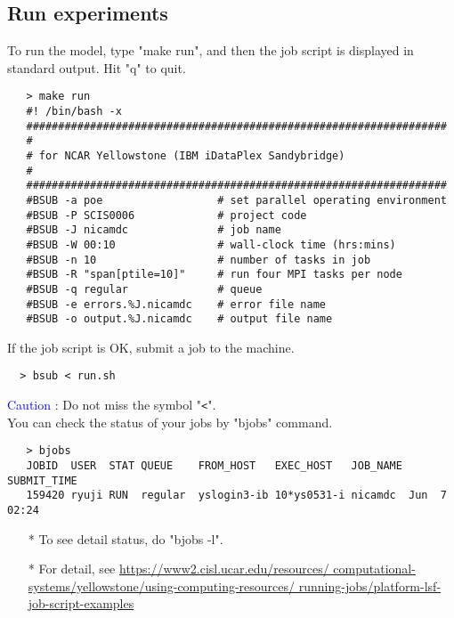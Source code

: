 \documentclass[a4paper]{article}
\begin{document}
\subsection{Run experiments}
   To run the model, type "make run", and then the job script is
   displayed in standard output. Hit "q" to quit.
 \begin{verbatim}
   > make run
   #! /bin/bash -x
   ##################################################################
   #
   # for NCAR Yellowstone (IBM iDataPlex Sandybridge)
   #
   ##################################################################
   #BSUB -a poe                  # set parallel operating environment
   #BSUB -P SCIS0006             # project code
   #BSUB -J nicamdc              # job name
   #BSUB -W 00:10                # wall-clock time (hrs:mins)
   #BSUB -n 10                   # number of tasks in job
   #BSUB -R "span[ptile=10]"     # run four MPI tasks per node
   #BSUB -q regular              # queue
   #BSUB -e errors.%J.nicamdc    # error file name
   #BSUB -o output.%J.nicamdc    # output file name
 \end{verbatim}

 \noindent If the job script is OK, submit a job to the machine.
 \begin{verbatim}
  > bsub < run.sh
 \end{verbatim}
 \noindent \textcolor{blue}{{\sf Caution}} : Do not miss the symbol "\verb|<|". \\

 \noindent You can check the status of your jobs by "bjobs" command.
 \begin{verbatim}
   > bjobs
   JOBID  USER  STAT QUEUE    FROM_HOST   EXEC_HOST   JOB_NAME SUBMIT_TIME
   159420 ryuji RUN  regular  yslogin3-ib 10*ys0531-i nicamdc  Jun  7 02:24
 \end{verbatim}

 \begin{itemize}
   \item[*] To see detail status, do "bjobs -l".
   \item[*] For detail, see \url{https://www2.cisl.ucar.edu/resources/
   computational-systems/yellowstone/using-computing-resources/
   running-jobs/platform-lsf-job-script-examples}
 \end{itemize}
\end{document}
